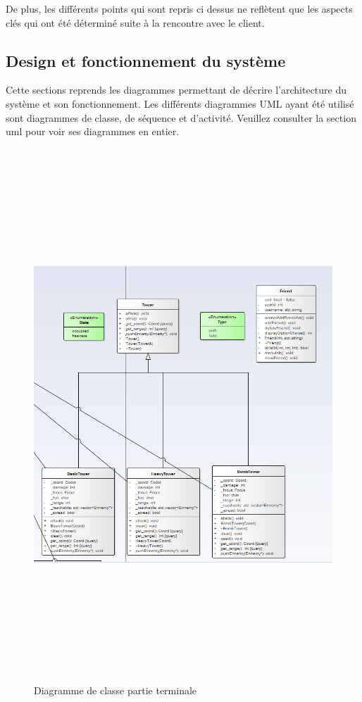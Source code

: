 \documentclass[12pt,a4paper]{article}
\begin{document}
De plus, les différents points qui sont repris ci dessus ne reflètent que les aspects clés qui ont été déterminé suite à la rencontre avec le client.\\
\subsection{Design et fonctionnement du système}
Cette sections reprends les diagrammes permettant de décrire l'architecture du système et son fonctionnement. Les différents diagrammes UML ayant été utilisé sont diagrammes de classe, de séquence et d'activité. Veuillez consulter la section uml pour voir ses diagrammes en entier.
\begin{figure}[H]
  \includegraphics[height=20cm,width=20cm]{classDiagram1.png}
  \caption{Diagramme de classe partie terminale}
   \label{fig:picture}
 \end{figure}
\end{document}
